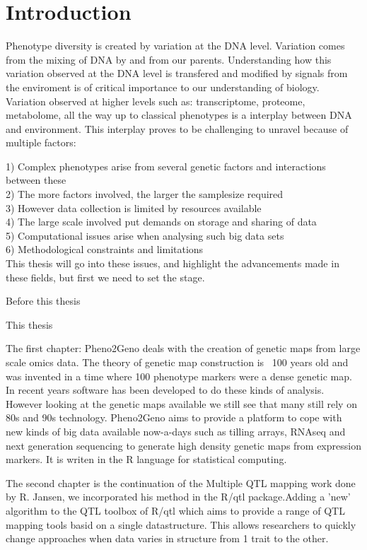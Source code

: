 \chapter{Introduction}
Phenotype diversity is created by variation at the DNA level. Variation comes from the 
mixing of DNA by and from our parents. Understanding how this variation observed at the 
DNA level is transfered and modified by signals from the enviroment is of critical 
importance to our understanding of biology. Variation observed at higher levels such 
as: transcriptome, proteome, metabolome, all the way up to classical phenotypes is a 
interplay between DNA and environment. This interplay proves to be challenging to unravel 
because of multiple factors:

1) Complex phenotypes arise from several genetic factors and interactions between these\\
2) The more factors involved, the larger the samplesize required\\
3) However data collection is limited by resources available\\
4) The large scale involved put demands on storage and sharing of data\\
5) Computational issues arise when analysing such big data sets\\
6) Methodological constraints and limitations\\

This thesis will go into these issues, and highlight the advancements made in these 
fields, but first we need to set the stage.

Before this thesis


This thesis

The first chapter: Pheno2Geno deals with the creation of genetic maps from large scale omics data. The theory 
of genetic map construction is ~100 years old and was invented in a time where 100 phenotype markers were a 
dense genetic map. In recent years software has been developed to do these kinds of analysis. However looking 
at the genetic maps available we still see that many still rely on 80s and 90s technology. Pheno2Geno aims to 
provide a platform to cope with new kinds of big data available now-a-days such as tilling arrays, RNAseq and 
next generation sequencing to generate high density genetic maps from expression markers. It is writen in the 
R language for statistical computing.

The second chapter is the continuation of the Multiple QTL mapping work done by R. Jansen, we incorporated his 
method in the R/qtl package.Adding a 'new' algorithm to the QTL toolbox of R/qtl which aims to provide a range 
of QTL mapping tools basid on a single datastructure. This allows researchers to quickly change approaches when 
data varies in structure from 1 trait to the other.

